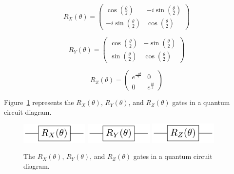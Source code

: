 \begin{linenomath}
\begin{equation}
	R_X(\theta)=\begin{pmatrix}
\cos(\frac{\theta}{2}) & -i\sin(\frac{\theta}{2}) \\
-i\sin(\frac{\theta}{2}) & \cos(\frac{\theta}{2})
\end{pmatrix} 
\label{eq:rotx}
\end{equation}
\end{linenomath}
\begin{linenomath}
\begin{equation}
	R_Y(\theta)=\begin{pmatrix}
\cos(\frac{\theta}{2}) & -\sin(\frac{\theta}{2}) \\
\sin(\frac{\theta}{2}) & \cos(\frac{\theta}{2})
\end{pmatrix}
\label{eq:roty}
\end{equation}
\end{linenomath}
\begin{linenomath}
\begin{equation}
	R_Z(\theta)=\begin{pmatrix}
e^{\frac{-i\theta}{2}} & 0 \\
0 & e^{\frac{i\theta}{2}}
\end{pmatrix}
\label{eq:rotz}
\end{equation}
\end{linenomath}

Figure~\ref{fig:rotscirc} represents the $R_X(\theta)$, $R_Y(\theta)$, 
and $R_Z(\theta)$ gates in a quantum circuit diagram.

\begin{figure}[!htbp]
\centering
	\includegraphics[width=0.30\textwidth]{figures/RX.pdf}
	\includegraphics[width=0.30\textwidth]{figures/RY.pdf}
	\includegraphics[width=0.30\textwidth]{figures/RZ.pdf}
\caption{The $R_X(\theta)$, $R_Y(\theta)$, and $R_Z(\theta)$ gates in a quantum 
circuit diagram.}
\label{fig:rotscirc}
\end{figure}

